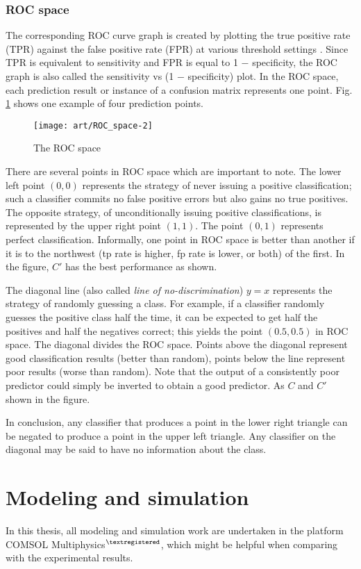 \subsubsection{ROC space}
The corresponding ROC curve graph is created by plotting the true positive rate (TPR) against the false positive rate (FPR) at various threshold settings \citep{Fawcett2006}.  Since TPR is equivalent to sensitivity and FPR is equal to 1 − specificity, the ROC graph is also called the sensitivity vs (1 − specificity) plot. In the ROC space, each prediction result or instance of a confusion matrix represents one point. Fig. \ref{ROC_space} shows one example of four prediction points.
\begin{figure}[ht]
	\centering
	\texttt{[image: art/ROC\_space-2]}
	\caption{The ROC space}
	\label{ROC_space}
\end{figure}
There are several points in ROC space which are important to note. The lower left point $ (0,0) $ represents the strategy of never issuing a positive classification; such a classifier commits no false positive errors but also gains no true positives. The opposite strategy, of unconditionally issuing positive classifications, is represented by the upper right point $ (1,1) $. The point $ (0,1) $ represents perfect classification.  Informally, one point in ROC space is better than another if it is to the northwest (tp rate is higher, fp rate is lower, or both) of the first. In the figure, $C'$ has the best performance as shown.

The diagonal line (also called \textit{line of no-discrimination}) $y = x$ represents the strategy of randomly guessing a class. For example, if a classifier randomly guesses the positive class half the time, it can be expected to get half the positives and half the negatives correct; this yields the point $ (0.5, 0.5) $ in ROC space. The diagonal divides the ROC space. Points above the diagonal represent good classification results (better than random), points below the line represent poor results (worse than random). Note that the output of a consistently poor predictor could simply be inverted to obtain a good predictor. As $C$ and $C'$ shown in the figure.

In conclusion,  any classifier that produces a point in the lower right triangle can be negated to produce a point in the upper left triangle. Any classifier on the diagonal may be said to have no information about the class.

\section{Modeling and simulation}
In this thesis, all modeling and simulation work are undertaken in the platform COMSOL Multiphysics$^{\textregistered}$, which might be helpful when comparing with the experimental results.

